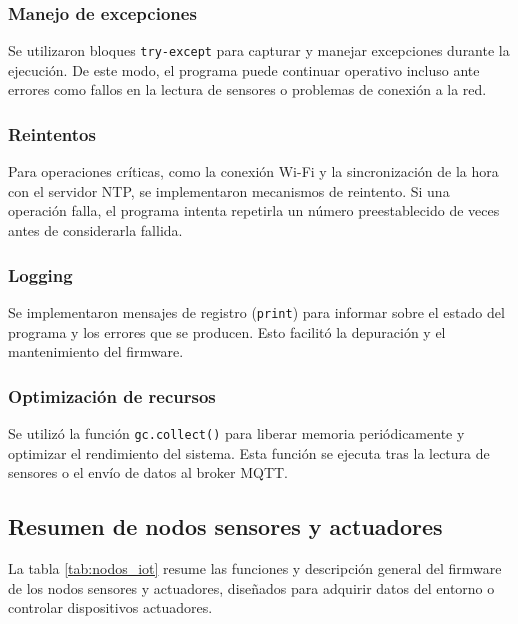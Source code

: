 \subsubsection{Manejo de excepciones}

Se utilizaron bloques \texttt{try-except} para capturar y manejar excepciones
durante la ejecución. De este modo, el programa puede continuar operativo
incluso ante errores como fallos en la lectura de sensores o problemas de
conexión a la red.

\subsubsection{Reintentos}

Para operaciones críticas, como la conexión Wi-Fi y la sincronización de la
hora con el servidor NTP, se implementaron mecanismos de reintento. Si una
operación falla, el programa intenta repetirla un número preestablecido de
veces antes de considerarla fallida.

\subsubsection{Logging}

Se implementaron mensajes de registro (\texttt{print}) para informar sobre el
estado del programa y los errores que se producen. Esto facilitó la depuración
y el mantenimiento del firmware.

\subsubsection{Optimización de recursos}

Se utilizó la función \texttt{gc.collect()} para liberar memoria periódicamente
y optimizar el rendimiento del sistema. Esta función se ejecuta tras la lectura
de sensores o el envío de datos al broker MQTT.

\subsection{Resumen de nodos sensores y actuadores}

La tabla \ref{tab:nodos_iot} resume las funciones y descripción general del
firmware de los nodos sensores y actuadores, diseñados para adquirir datos del
entorno o controlar dispositivos actuadores.

